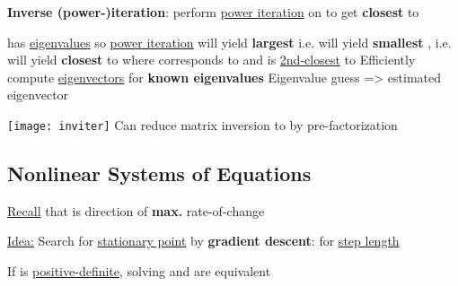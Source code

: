 \hSep %

\textbf{Inverse (power-)iteration}: perform \ul{power iteration} on
 to get  \textbf{closest} to \iMbox{\sigma}
\begin{itemize}

      \vItem
             has \ul{eigenvalues}
             so \ul{power iteration} will yield
            \textbf{largest }
      \vItem
            i.e. will yield \textbf{smallest
                  }, i.e. will yield
             \textbf{closest} to \iMbox{\sigma}
      \vItem
            where  corresponds to
             and  is \ul{2nd-closest} to \iMbox{\sigma}
      \vItem
            Efficiently compute \ul{eigenvectors} for \textbf{known eigenvalues}
            \iMbox{\sigma}
      \vItem
            Eigenvalue guess => estimated eigenvector

            \texttt{[image: inviter]}
      \vItem
            Can reduce matrix inversion  to  by
            pre-factorization
\end{itemize}


\columnbreak

\subsection*{Nonlinear Systems of Equations}

\ul{Recall} that  is direction of \textbf{max.}
rate-of-change 

\ul{Idea:} Search for \ul{stationary point} by \textbf{gradient descent}:
for \ul{step length} \iMbox{\alpha}

\hSep %

If  is \ul{positive-definite}, solving  and
are equivalent


